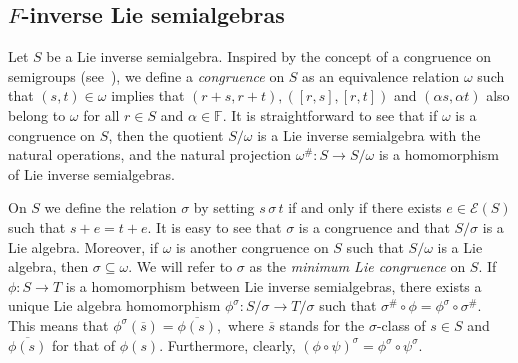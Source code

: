 \documentclass{amsart}
\newcommand{\E}{\mathcal{E}}
\newcommand{\F}{\mathbb{F}}
\newcommand{\0}{{\vartheta}}
\theoremstyle{definition}
\theoremstyle{remark}
\numberwithin{equation}{section}
\newtheorem*{Theorem A}{\textbf{Theorem A}}
\newtheorem*{Corollary E}{\textbf{Corollary E}}
\newtheorem*{Corollary F}{\textbf{Corollary F}}
\newtheorem*{Theorem B}{\textbf{Theorem B}}
\newtheorem*{Theorem C}{\textbf{Theorem C}}
\newtheorem*{Theorem D}{\textbf{Theorem B}}
\newtheorem*{p a}{\textbf{Proof of  Theorem A}}
\newtheorem*{p b}{\textbf{Proof of Theorem B}}
\newtheorem*{p c}{\textbf{Proof of  Theorem C}}
\newtheorem*{p d}{\textbf{Proof of  Theorem D}}
\begin{document}
\subsection{$F$-inverse Lie semialgebras}\label{s: F-inverse Lie semialgebras}
Let $S$ be a Lie inverse semialgebra. Inspired by the concept of a congruence on semigroups (see~\cite{Lawson,Petrich1984}), we define a {\em  congruence} on $S$ as an equivalence relation $\omega $ such that $(s,t)\in\omega $  implies that $(r+s,r+t), ([r,s],[r,t])$ and $(\alpha s,\alpha t)$ also belong to $\omega$ for all $r\in S$ and $\alpha\in \F$. It is straightforward to see that if $\omega $ is a congruence on $S$, then the quotient $S/\omega$ is a Lie inverse semialgebra with the natural operations, and the natural projection $\omega^\#: S\to S/\omega$ is a homomorphism of Lie inverse semialgebras. 

On $S$ we define the relation $\sigma $ by setting  $s\,\sigma\, t$ if and only if there exists $e\in \E(S)$ such that $s+e=t+e$. It is easy to see that $\sigma$ is a congruence and that $S/\sigma$ is a Lie algebra. Moreover, if $\omega $ is another congruence on $S$ such that $S/\omega $ is a Lie algebra, then $\sigma\subseteq \omega .$ We will refer to $\sigma$ as the {\em minimum Lie congruence } on $S$.  If $\phi:S\to T$ is a homomorphism between  Lie inverse semialgebras, there exists a unique Lie algebra homomorphism  $\phi^{\sigma} : S/\sigma \to T/\sigma $ such that $\sigma^{\#}\circ \phi=\phi^\sigma\circ \sigma^{\#}$. This means that
$\phi^{\sigma} (\overline{s}) = \overline{\phi (s)}, $ where
$\overline{s}$ stands for the $\sigma$-class of $s\in S$  and $\overline{\phi (s)}$ for that of $\phi (s).$
Furthermore, clearly, $(\phi\circ \psi)^\sigma=\phi^\sigma\circ \psi^\sigma.$
\end{document}
